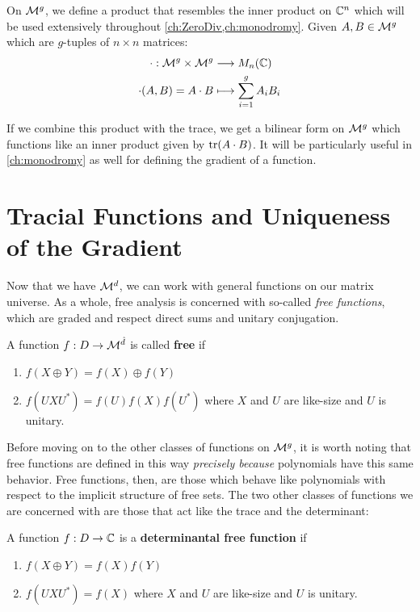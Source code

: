 On \(\mathcal{M}^{g} \), we define a product that resembles the inner product on
\(\mathbb{C}^n\) which will be used extensively throughout \cref{ch:ZeroDiv,ch:monodromy}.
Given \(A,B \in \mathcal{M}^{g} \) which are \(g\)-tuples of \(n \times n\) matrices:
\begin{align*}
	\cdot : \mathcal{M}^{g} \times \mathcal{M}^{g}  &\longrightarrow M_n(\mathbb{C}) \\
  \cdot (A,B) = A \cdot B &\longmapsto \sum_{i=1}^g A_i B_i
\end{align*}

If we combine this product with the trace, we get a bilinear form on
\(\mathcal{M}^{g} \) which functions like an inner product given by \(\operatorname{tr}(A \cdot B)\).
It will be particularly useful in \cref{ch:monodromy} as well for defining the
gradient of a function.


\section{Tracial Functions and Uniqueness of the Gradient}%
\label{sec:TracGrad}
Now that we have \(\mathcal{M}^d\), we can work with general functions on our matrix
universe. As a whole, free analysis is concerned with so-called \emph{free
  functions}, which are graded and
respect direct sums and unitary conjugation.

\begin{definition}
\label{def:FreeFun}
  A function \(f: D\to \mathcal{M}^{\hat{d}}\) is called \textbf{free} if
  \begin{enumerate}
    \item \(f(X\oplus Y)= f(X) \oplus f(Y)\)
    \item \(f(U X U^*) = f(U)f(X)f(U^*)\) where \(X\) and \(U\) are like-size
          and \(U\) is unitary.
  \end{enumerate}
\end{definition}

Before moving on to the other classes of functions on \(\mathcal{M}^{g}\), it is worth
noting that free functions are defined in this way \emph{precisely because}
polynomials have this same behavior. Free functions, then, are those which
behave like polynomials with respect to the implicit structure of free sets.
The two other classes of functions we are concerned with are those that act like
the trace and the determinant:
\begin{definition}%
\label{def:DetFreeFun}
  A function \(f: D \to \mathbb{C} \) is a \textbf{determinantal free function} if
  \begin{enumerate}
    \item \(f(X\oplus Y) = f(X)f(Y)\)
    \item \(f(U X U^*) = f(X)\) where \(X\) and \(U\) are like-size
          and \(U\) is unitary.
  \end{enumerate}
\end{definition}

